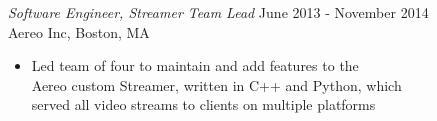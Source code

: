 \documentclass[line,margin]{res}
\begin{document}
\begin{resume}
            {\sl Software Engineer, Streamer Team Lead} \hfill June 2013 - November 2014 \\ %
            Aereo Inc, Boston, MA
                \begin{itemize} \itemsep -2pt %
                    \item Led team of four to maintain and add features to the \\
                          Aereo custom Streamer, written in C++ and Python, which \\
                          served all video streams to clients on multiple platforms
                \end{itemize}



\end{resume}
\end{document}
